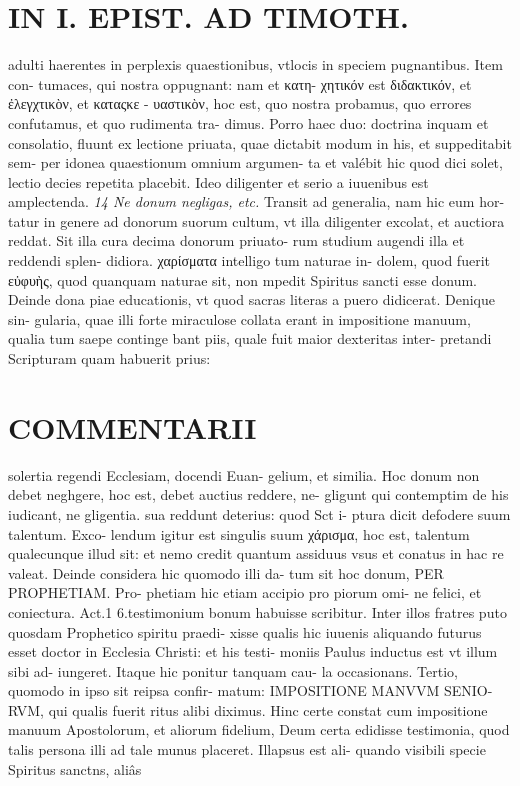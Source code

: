 \documentclass{article}
\begin{document}
\begin{pages}
\section*{IN I. EPIST. AD TIMOTH. }
\marginpar{[ p.111 ]}\pstart adulti haerentes in perplexis quaestionibus, vtlocis in speciem pugnantibus. Item con- tumaces, qui nostra oppugnant: nam et κατη- χητικόν est διδακτικόν, et ἐλεγχτικὸν, et καταςκε - υαστικὸν, hoc est, quo nostra probamus, quo errores confutamus, et quo rudimenta tra- dimus. Porro haec duo: doctrina inquam et consolatio, fluunt ex lectione priuata, quae dictabit modum in his, et suppeditabit sem- per idonea quaestionum omnium argumen- ta et valébit hic quod dici solet, lectio decies repetita placebit. Ideo diligenter et serio a iuuenibus est amplectenda.  \pend
\textit{14  Ne donum negligas, etc. }\pstart Transit ad generalia, nam hic eum hor- tatur in genere ad donorum suorum cultum, vt illa diligenter excolat, et auctiora reddat. Sit illa cura decima donorum priuato- rum studium augendi illa et reddendi splen- didiora. χαρίσματα intelligo tum naturae in- dolem, quod fuerit εὐφυὴς, quod quanquam naturae sit, non mpedit Spiritus sancti esse donum.  \pend\pstart Deinde dona piae educationis, vt quod sacras literas a puero didicerat. Denique sin- gularia, quae illi forte miraculose collata erant in impositione manuum, qualia tum saepe continge bant piis, quale fuit maior dexteritas inter- pretandi Scripturam quam habuerit prius:  \pend
\marginpar{[ p.112 ]}
\section*{COMMENTARII }\pstart solertia regendi Ecclesiam, docendi Euan- gelium, et similia. Hoc donum non debet neghgere, hoc est, debet auctius reddere, ne- gligunt qui contemptim de his iudicant, ne gligentia. sua reddunt deterius: quod Sct i- ptura dicit defodere suum talentum. Exco- lendum igitur est singulis suum χάρισμα, hoc est, talentum qualecunque illud sit: et nemo credit quantum assiduus vsus et conatus in hac re valeat.  \pend\pstart Deinde considera hic quomodo illi da- tum sit hoc donum, PER PROPHETIAM. Pro- phetiam hic etiam accipio pro piorum omi- ne felici, et coniectura. Act.1 6.testimonium bonum habuisse scribitur. Inter illos fratres puto quosdam Prophetico spiritu praedi- xisse qualis hic iuuenis aliquando futurus esset doctor in Ecclesia Christi: et his testi- moniis Paulus inductus est vt illum sibi ad- iungeret. Itaque hic ponitur tanquam cau- la occasionans.  \pend\pstart Tertio, quomodo in ipso sit reipsa confir- matum: IMPOSITIONE MANVVM SENIO- RVM, qui qualis fuerit ritus alibi diximus. Hinc certe constat cum impositione manuum Apostolorum, et aliorum fidelium, Deum certa edidisse testimonia, quod talis persona illi ad tale munus placeret. Illapsus est ali- quando visibili specie Spiritus sanctns, aliâs  \pend

\end{pages}
\end{document}
